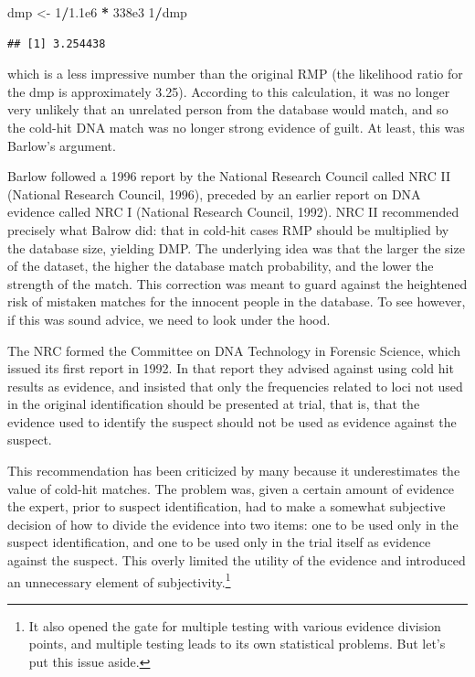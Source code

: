 \documentclass[10pt,dvipsnames,enabledeprecatedfontcommands]{scrartcl}
\newenvironment{Shaded}{\begin{snugshade}}{\end{snugshade}}
\newcommand{\DecValTok}[1]{\textcolor[rgb]{0.00,0.00,0.81}{#1}}
\newcommand{\FloatTok}[1]{\textcolor[rgb]{0.00,0.00,0.81}{#1}}
\newcommand{\StringTok}[1]{\textcolor[rgb]{0.31,0.60,0.02}{#1}}
\newcommand{\OperatorTok}[1]{\textcolor[rgb]{0.81,0.36,0.00}{\textbf{#1}}}
\newcommand{\NormalTok}[1]{#1}
\begin{document}

\begin{Shaded}
\begin{Highlighting}[]
\NormalTok{dmp <-}\StringTok{ }\DecValTok{1}\OperatorTok{/}\FloatTok{1.1e6} \OperatorTok{*}\StringTok{ }\FloatTok{338e3}
\DecValTok{1}\OperatorTok{/}\NormalTok{dmp}
\end{Highlighting}
\end{Shaded}

\begin{verbatim}
## [1] 3.254438
\end{verbatim}

\noindent which is a less impressive number than the original RMP (the
likelihood ratio for the dmp is approximately 3.25). According to this
calculation, it was no longer very unlikely that an unrelated person
from the database would match, and so the cold-hit DNA match was no
longer strong evidence of guilt. At least, this was Barlow's argument.

Barlow followed a 1996 report by the National Research Council called
NRC II (National Research Council, 1996), preceded by an earlier report
on DNA evidence called NRC I (National Research Council, 1992). NRC II
recommended precisely what Balrow did: that in cold-hit cases RMP should
be multiplied by the database size, yielding DMP. The underlying idea
was that the larger the size of the dataset, the higher the database
match probability, and the lower the strength of the match. This
correction was meant to guard against the heightened risk of mistaken
matches for the innocent people in the database. To see however, if this
was sound advice, we need to look under the hood.

The NRC formed the Committee on DNA Technology in Forensic Science,
which issued its first report in 1992. In that report they advised
against using cold hit results as evidence, and insisted that only the
frequencies related to loci not used in the original identification
should be presented at trial, that is, that the evidence used to
identify the suspect should not be used as evidence against the suspect.

This recommendation has been criticized by many because it
underestimates the value of cold-hit matches. The problem was, given a
certain amount of evidence the expert, prior to suspect identification,
had to make a somewhat subjective decision of how to divide the evidence
into two items: one to be used only in the suspect identification, and
one to be used only in the trial itself as evidence against the suspect.
This overly limited the utility of the evidence and introduced an
unnecessary element of
subjectivity.\footnote{It also opened the gate for multiple testing with various evidence division points, and multiple testing leads to its own statistical problems. But let's put this issue aside.}
\end{document}
